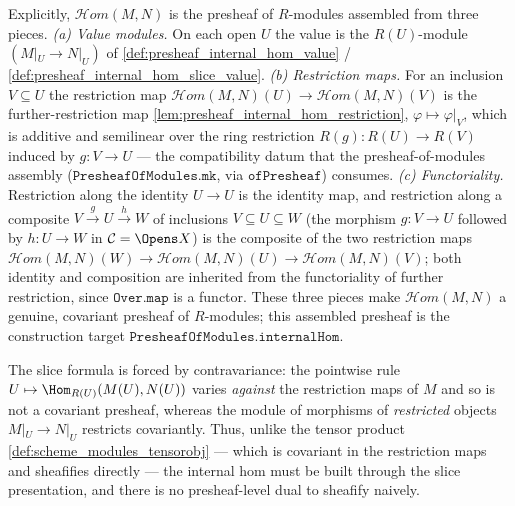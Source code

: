 \begin{definition}
  Explicitly, \(\mathcal{H}om(M, N)\) is the presheaf of \(R\)-modules assembled from
  three pieces. \emph{(a) Value modules.} On each open \(U\) the value is the
  \(R(U)\)-module \((M|_U \to N|_U)\) of \cref{def:presheaf_internal_hom_value} /
  \cref{def:presheaf_internal_hom_slice_value}. \emph{(b) Restriction maps.} For an
  inclusion \(V \subseteq U\) the restriction map
  \(\mathcal{H}om(M, N)(U) \to \mathcal{H}om(M, N)(V)\) is the further-restriction map
  \cref{lem:presheaf_internal_hom_restriction}, \(\varphi \mapsto \varphi|_V\), which
  is additive and semilinear over the ring restriction \(R(g) : R(U) \to R(V)\)
  induced by \(g : V \to U\) --- the compatibility datum that the presheaf-of-modules
  assembly (\(\mathtt{PresheafOfModules.mk}\), via \(\mathtt{ofPresheaf}\)) consumes.
  \emph{(c) Functoriality.} Restriction along the identity \(U \to U\) is the identity
  map, and restriction along a composite \(V \xrightarrow{g} U \xrightarrow{h} W\) of
  inclusions \(V \subseteq U \subseteq W\) (the morphism \(g : V \to U\) followed by
  \(h : U \to W\) in \(\mathcal{C} = \Opens X\)) is the composite of the two
  restriction maps \(\mathcal{H}om(M,N)(W) \to \mathcal{H}om(M,N)(U) \to
  \mathcal{H}om(M,N)(V)\); both identity and composition are inherited from the
  functoriality of further restriction, since \(\mathtt{Over.map}\) is a functor. These three pieces
  make \(\mathcal{H}om(M, N)\) a genuine, covariant presheaf of \(R\)-modules; this
  assembled presheaf is the construction target \(\mathtt{PresheafOfModules.internalHom}\).

  The slice formula is forced by contravariance: the pointwise rule
  \(U \mapsto \Hom_{R(U)}(M(U), N(U))\) varies \emph{against} the restriction maps of
  \(M\) and so is not a covariant presheaf, whereas the module of morphisms of
  \emph{restricted} objects \(M|_U \to N|_U\) restricts covariantly. Thus, unlike the
  tensor product \cref{def:scheme_modules_tensorobj} --- which is covariant in the
  restriction maps and sheafifies directly --- the internal hom must be built through
  the slice presentation, and there is no presheaf-level dual to sheafify naively.
\end{definition}

